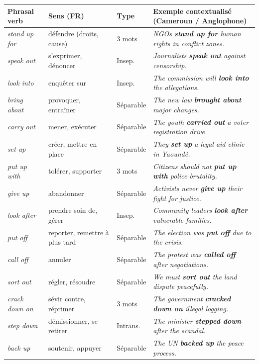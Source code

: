\documentclass[11pt]{article}
\newcommand{\eng}[1]{\ifmmode\text{\textit{#1}}\else\begingroup\selectlanguage{english}\itshape #1\endgroup\fi}
\begin{document}
\begin{definition}
\begin{center}
\begin{tabularx}{\linewidth}{|l|X|l|X|}\hline
\rowcolor{popblueL} \textbf{Phrasal verb} & \textbf{Sens (FR)} & \textbf{Type} & \textbf{Exemple contextualisé (Cameroun / Anglophone)} \\ \hline
\eng{stand up for} & défendre (droits, cause) & 3 mots & \eng{NGOs \textbf{stand up for} human rights in conflict zones.} \\ \hline
\eng{speak out} & s'exprimer, dénoncer & Insep. & \eng{Journalists \textbf{speak out} against censorship.} \\ \hline
\eng{look into} & enquêter sur & Insep. & \eng{The commission will \textbf{look into} the allegations.} \\ \hline
\eng{bring about} & provoquer, entraîner & Séparable & \eng{The new law \textbf{brought about} major changes.} \\ \hline
\eng{carry out} & mener, exécuter & Séparable & \eng{The youth \textbf{carried out} a voter registration drive.} \\ \hline
\eng{set up} & créer, mettre en place & Séparable & \eng{They \textbf{set up} a legal aid clinic in Yaoundé.} \\ \hline
\eng{put up with} & tolérer, supporter & 3 mots & \eng{Citizens should not \textbf{put up with} police brutality.} \\ \hline
\eng{give up} & abandonner & Séparable & \eng{Activists never \textbf{give up} their fight for justice.} \\ \hline
\eng{look after} & prendre soin de, gérer & Insep. & \eng{Community leaders \textbf{look after} vulnerable families.} \\ \hline
\eng{put off} & reporter, remettre à plus tard & Séparable & \eng{The election was \textbf{put off} due to the crisis.} \\ \hline
\eng{call off} & annuler & Séparable & \eng{The protest was \textbf{called off} after negotiations.} \\ \hline
\eng{sort out} & régler, résoudre & Séparable & \eng{We must \textbf{sort out} the land dispute peacefully.} \\ \hline
\eng{crack down on} & sévir contre, réprimer & 3 mots & \eng{The government \textbf{cracked down on} illegal logging.} \\ \hline
\eng{step down} & démissionner, se retirer & Intrans. & \eng{The minister \textbf{stepped down} after the scandal.} \\ \hline
\eng{back up} & soutenir, appuyer & Séparable & \eng{The UN \textbf{backed up} the peace process.} \\ \hline
\end{tabularx}
\end{center}
\end{definition}
\end{document}
